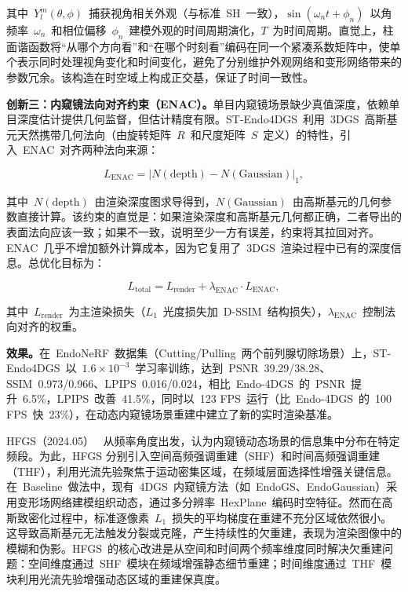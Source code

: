 其中~$Y_l^m(\theta,\phi)$~捕获视角相关外观（与标准~SH~一致），$\sin(\omega_n t + \phi_n)$~以角频率~$\omega_n$~和相位偏移~$\phi_n$~建模外观的时间周期演化，$T$~为时间周期。直觉上，柱面谐函数将``从哪个方向看''和``在哪个时刻看''编码在同一个紧凑系数矩阵中，使单个表示同时处理视角变化和时间变化，避免了分别维护外观网络和变形网络带来的参数冗余。该构造在时空域上构成正交基，保证了时间一致性。

\textbf{创新三：内窥镜法向对齐约束（ENAC）。}单目内窥镜场景缺少真值深度，依赖单目深度估计提供几何监督，但估计精度有限。ST-Endo4DGS~利用~3DGS~高斯基元天然携带几何法向（由旋转矩阵~$R$~和尺度矩阵~$S$~定义）的特性，引入~ENAC~对齐两种法向来源：

\begin{equation}
L_{\text{ENAC}} = \left| N(\text{depth}) - N(\text{Gaussian}) \right|_1,
\end{equation}

其中~$N(\text{depth})$~由渲染深度图求导得到，$N(\text{Gaussian})$~由高斯基元的几何参数直接计算。该约束的直觉是：如果渲染深度和高斯基元几何都正确，二者导出的表面法向应该一致；如果不一致，说明至少一方有误差，约束将其拉回对齐。ENAC~几乎不增加额外计算成本，因为它复用了~3DGS~渲染过程中已有的深度信息。总优化目标为：

\begin{equation}
L_{\text{total}} = L_{\text{render}} + \lambda_{\text{ENAC}} \cdot L_{\text{ENAC}},
\end{equation}

其中~$L_{\text{render}}$~为主渲染损失（$L_1$~光度损失加~D-SSIM~结构损失），$\lambda_{\text{ENAC}}$~控制法向对齐的权重。

\textbf{效果。}在~EndoNeRF~数据集（Cutting/Pulling~两个前列腺切除场景）上，ST-Endo4DGS~以~$1.6 \times 10^{-3}$~学习率训练，达到~PSNR~39.29/38.28、SSIM~0.973/0.966、LPIPS~0.016/0.024，相比~Endo-4DGS~的~PSNR~提升~6.5\%，LPIPS~改善~41.5\%，同时以~123 FPS~运行（比~Endo-4DGS~的~100 FPS~快~23\%），在动态内窥镜场景重建中建立了新的实时渲染基准。

HFGS（2024.05）~\cite{2405_17872} 从频率角度出发，认为内窥镜动态场景的信息集中分布在特定频段。为此，HFGS 分别引入空间高频强调重建（SHF）和时间高频强调重建（THF），利用光流先验聚焦于运动密集区域，在频域层面选择性增强关键信息。在~Baseline~做法中，现有~4DGS~内窥镜方法（如~EndoGS、EndoGaussian）采用变形场网络建模组织动态，通过多分辨率~HexPlane~编码时空特征。然而在高斯致密化过程中，标准逐像素~$L_1$~损失的平均梯度在重建不充分区域依然很小。这导致高斯基元无法触发分裂或克隆，产生持续性的欠重建，表现为渲染图像中的模糊和伪影。HFGS~的核心改进是从空间和时间两个频率维度同时解决欠重建问题：空间维度通过~SHF~模块在频域增强静态细节重建；时间维度通过~THF~模块利用光流先验增强动态区域的重建保真度。

